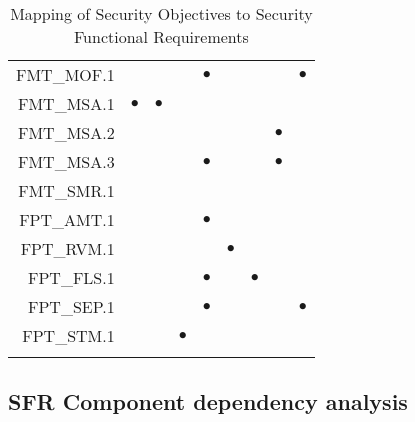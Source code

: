 \documentclass[12pt,english]{scrbook}
\newcommand{\oh}{$\bullet$}
\begin{document}
\begin{longtable}{rRRRRRRRR}
FMT\_MOF.1                  &      &              &         &  \oh      &          &             &              & \oh          \\
FMT\_MSA.1                  & \oh  &  \oh         &         &           &          &             &              &              \\
FMT\_MSA.2                  &      &              &         &           &          &             &  \oh         &              \\  
FMT\_MSA.3                  &      &              &         & \oh       &          &             &  \oh         &              \\
FMT\_SMR.1                  &      &              &         &           &          &             &              &              \\
FPT\_AMT.1                  &      &              &         & \oh       &          &             &              &              \\
FPT\_RVM.1                  &      &              &         &           &  \oh     &             &              &              \\
FPT\_FLS.1                  &      &              &         &  \oh      &          &   \oh       &              &              \\
FPT\_SEP.1                  &      &              &         &   \oh     &          &             &              &   \oh        \\
FPT\_STM.1                  &      &              &  \oh    &           &          &             &              &              \\
 \bottomrule
 \caption{Mapping of Security Objectives to Security Functional Requirements}
\end{longtable}

\subsection{SFR Component dependency analysis}
\end{document}

